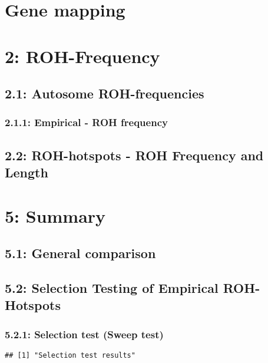 \documentclass[
]{article}
\begin{document}
\section{Gene mapping}\label{gene-mapping}

\section{2: ROH-Frequency}\label{roh-frequency}

\subsection{2.1: Autosome
ROH-frequencies}\label{autosome-roh-frequencies}

\subsubsection{2.1.1: Empirical - ROH
frequency}\label{empirical---roh-frequency}

\subsection{2.2: ROH-hotspots - ROH Frequency and
Length}\label{roh-hotspots---roh-frequency-and-length}

\section{5: Summary}\label{summary}

\subsection{5.1: General comparison}\label{general-comparison}

\subsection{5.2: Selection Testing of Empirical
ROH-Hotspots}\label{selection-testing-of-empirical-roh-hotspots}

\subsubsection{5.2.1: Selection test (Sweep
test)}\label{selection-test-sweep-test}

\begin{verbatim}
## [1] "Selection test results"
\end{verbatim}
\end{document}

